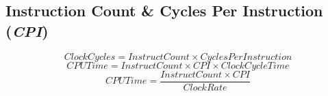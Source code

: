 \documentclass[12pt]{article}
\begin{document}
\subsection*{Instruction Count \& Cycles Per Instruction (\textit{CPI})}
\begin{equation}
    ClockCycles = InstructCount \times CyclesPerInstruction
\end{equation}
\begin{equation}
    CPUTime=InstructCount \times CPI \times ClockCycleTime
\end{equation}
\begin{equation}
    CPUTime = \frac{InstructCount \times CPI}{Clock Rate}
\end{equation}
\end{document}
